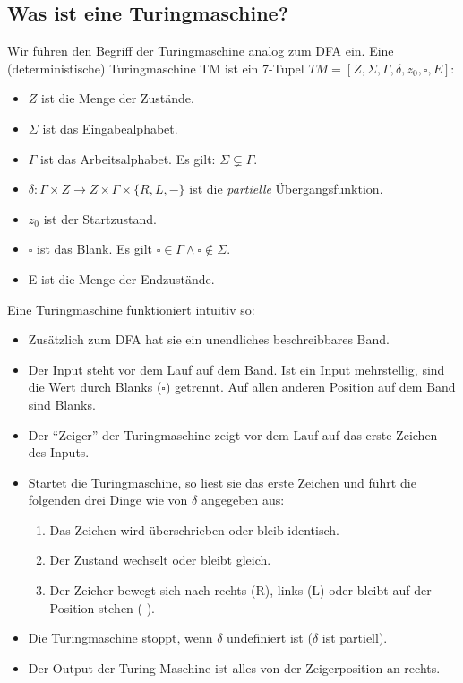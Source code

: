 \subsection{Was ist eine Turingmaschine?}

Wir führen den Begriff der Turingmaschine analog zum DFA ein.
Eine (deterministische) Turingmaschine TM ist ein 7-Tupel 
$TM = [Z, \Sigma, \Gamma, \delta, z_0, \square, E]$:
\begin{itemize}
    \item $Z$ ist die Menge der Zustände.
    \item $\Sigma$ ist das Eingabealphabet.
    \item $\Gamma$ ist das Arbeitsalphabet. Es gilt: $\Sigma \subsetneq \Gamma$.
    \item $\delta: \Gamma \times Z \rightarrow Z \times \Gamma \times \{R,L,-\}$
        ist die \emph{partielle} Übergangsfunktion.
    \item $z_0$ ist der Startzustand.
    \item $\square$ ist das Blank.
        Es gilt $\square \in \Gamma \wedge \square \notin \Sigma$.
    \item E ist die Menge der Endzustände.
\end{itemize}

\noindent
Eine Turingmaschine funktioniert intuitiv so:
\begin{itemize}
    \item Zusätzlich zum DFA hat sie ein unendliches beschreibbares Band.
    \item Der Input steht vor dem Lauf auf dem Band.
        Ist ein Input mehrstellig, sind die Wert durch Blanks ($\square$) getrennt.
        Auf allen anderen Position auf dem Band sind Blanks.
    \item Der ``Zeiger'' der Turingmaschine zeigt vor dem Lauf auf das erste Zeichen des Inputs.
    \item Startet die Turingmaschine,
        so liest sie das erste Zeichen
        und führt die folgenden drei Dinge wie von $\delta$ angegeben aus:
        \begin{enumerate}
            \item Das Zeichen wird überschrieben oder bleib identisch.
            \item Der Zustand wechselt oder bleibt gleich.
            \item Der Zeicher bewegt sich nach
                rechts (R),
                links (L)
                oder bleibt auf der Position stehen (-).
        \end{enumerate}
    \item Die Turingmaschine stoppt,
        wenn $\delta$ undefiniert ist ($\delta$ ist partiell).
    \item Der Output der Turing-Maschine ist alles von der Zeigerposition an rechts. 
\end{itemize}

